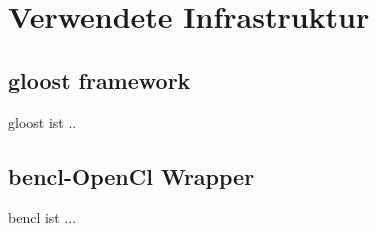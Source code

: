 \chapter{Verwendete Infrastruktur}


\section{gloost framework}
gloost ist ..


\section{bencl-OpenCl Wrapper}
bencl ist ...